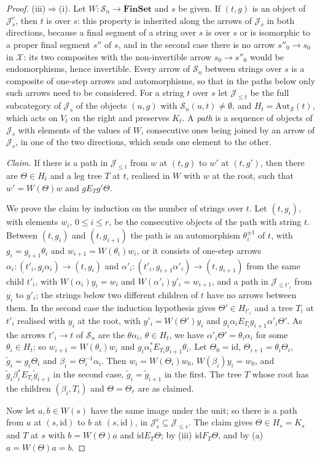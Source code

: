 \documentclass[11pt]{amsart}
\theoremstyle{definition}
\newcommand{\Fin}{\mathbf{FinSet}}
\newcommand{\Aut}{\mathrm{Aut}}
\newcommand{\cX}{\mathcal X}
\newcommand{\cS}{\mathcal S}
\newcommand{\cJ}{\mathcal J}
\newcommand{\id}{\mathrm{id}}
\begin{document}
\begin{proof}
(iii)$\Rightarrow$(i). Let $W\colon\cS_n\to\Fin$ and $s$ be given.
If $(t,g)$ is an object of $\cJ^c_s$, then $t$ is over $s$: this
property is inherited along the arrows of $\cJ_s$ in both directions,
because a final segment of a string over $s$ is over $s$ or is
isomorphic to a proper final segment $s''$ of $s$, and in the second
case there is no arrow $s''_0\to s_0$ in $\cX$: its two composites
with the non-invertible arrow $s_0\to s''_0$ would be endomorphisms,
hence invertible. Every arrow of $\cS_n$ between strings over $s$ is
a composite of one-step arrows and automorphisms, so that in the
paths below only such arrows need to be considered. For a string $t$ over $s$ let
$\cJ_{\le t}$ be the full subcategory of $\cJ_s$ of the objects
$(u,g)$ with $\cS_n(u,t)\ne\emptyset$, and $H_t=\Aut_{\cS}(t)$, which
acts on $V_t$ on the right and preserves $K_t$. A \emph{path} is a
sequence of objects of $\cJ_s$ with elements of the values of $W$,
consecutive ones being joined by an arrow of $\cJ_s$, in one of the
two directions, which sends one element to the other.

\emph{Claim.} If there is a path in $\cJ_{\le t}$ from $w$ at $(t,g)$
to $w'$ at $(t,g')$, then there are $\Theta\in H_t$ and a leg tree
$T$ at $t$, realised in $W$ with $w$ at the root, such that
$w'=W(\Theta)w$ and $g\mathrel{E_T}g'\Theta$.

We prove the claim by induction on the number of strings over $t$.
Let $(t,g_i)$, with elements $w_i$, $0\le i\le r$, be the consecutive
objects of the path with string $t$. Between $(t,g_i)$ and
$(t,g_{i+1})$ the path is an automorphism $\theta_i^{\pm1}$ of $t$, with
$g_i=g_{i+1}\theta_i$ and $w_{i+1}=W(\theta_i)w_i$, or it consists of
one-step arrows $\alpha_i\colon(t'_i,g_i\alpha_i)\to(t,g_i)$ and
$\alpha'_i\colon(t'_i,g_{i+1}\alpha'_i)\to(t,g_{i+1})$ from the same
child $t'_i$, with $W(\alpha_i)y_i=w_i$ and $W(\alpha'_i)y'_i=
w_{i+1}$, and a path in $\cJ_{\le t'_i}$ from $y_i$ to $y'_i$; the
strings below two different children of $t$ have no arrows between
them. In the second case the induction hypothesis gives $\Theta'\in
H_{t'_i}$ and a tree $T_i$ at $t'_i$ realised with $y_i$ at the root,
with $y'_i=W(\Theta')y_i$ and $g_i\alpha_i\mathrel{E_{T_i}}g_{i+1}
\alpha'_i\Theta'$. As the arrows $t'_i\to t$ of $\cS_n$ are the
$\theta\alpha_i$, $\theta\in H_t$, we have $\alpha'_i\Theta'=\theta_i
\alpha_i$ for some $\theta_i\in H_t$; so $w_{i+1}=W(\theta_i)w_i$ and
$g_i\mathrel{\alpha_i^*E_{T_i}}g_{i+1}\theta_i$. Let $\Theta_0=\id$,
$\Theta_{i+1}=\theta_i\Theta_i$, $\tilde g_i=g_i\Theta_i$ and
$\beta_i=\Theta_i^{-1}\alpha_i$. Then $w_i=W(\Theta_i)w_0$,
$W(\beta_i)y_i=w_0$, and $\tilde g_i\mathrel{\beta_i^*E_{T_i}}\tilde
g_{i+1}$ in the second case, $\tilde g_i=\tilde g_{i+1}$ in the first.
The tree $T$ whose root has the children $(\beta_i,T_i)$ and
$\Theta=\Theta_r$ are as claimed.

Now let $a,b\in W(s)$ have the same image under the unit; so there is
a path from $a$ at $(s,\id)$ to $b$ at $(s,\id)$, in $\cJ^c_s\subseteq
\cJ_{\le s}$. The claim gives $\Theta\in H_s=K_s$ and $T$ at $s$ with
$b=W(\Theta)a$ and $\id\mathrel{E_T}\Theta$; by (iii)
$\id\mathrel{F_T}\Theta$, and by (a) $a=W(\Theta)a=b$.
\end{proof}
\end{document}

